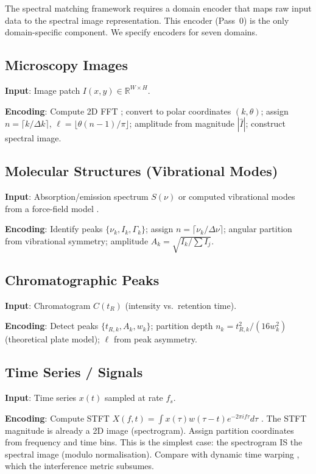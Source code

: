 \documentclass[11pt,twocolumn,a4paper]{article}
\newcommand{\R}{\mathbb{R}}
\begin{document}
The spectral matching framework requires a domain encoder that maps raw
input data to the spectral image representation. This encoder (Pass~0)
is the only domain-specific component. We specify encoders for seven
domains.

\subsection{Microscopy Images}
\label{subsec:enc_micro}

\textbf{Input}: Image patch $I(x,y) \in \R^{W \times H}$.

\textbf{Encoding}: Compute 2D FFT \citep{cooley1965}; convert to polar
coordinates $(k, \theta)$; assign $n = \lceil k/\Delta k \rceil$,
$\ell = \lfloor \theta(n-1)/\pi \rfloor$; amplitude from magnitude
$|\hat{I}|$; construct spectral image.

\subsection{Molecular Structures (Vibrational Modes)}
\label{subsec:enc_mol}

\textbf{Input}: Absorption/emission spectrum $S(\nu)$ or computed
vibrational modes from a force-field model
\citep{lennardjones1924}.

\textbf{Encoding}: Identify peaks $\{\nu_k, I_k, \Gamma_k\}$; assign
$n = \lceil \nu_k / \Delta\nu \rceil$; angular partition from
vibrational symmetry; amplitude $A_k = \sqrt{I_k / \sum I_j}$.

\subsection{Chromatographic Peaks}
\label{subsec:enc_chrom}

\textbf{Input}: Chromatogram $C(t_R)$ (intensity vs.\ retention time).

\textbf{Encoding}: Detect peaks $\{t_{R,k}, A_k, w_k\}$; partition
depth $n_k = t_{R,k}^2 / (16 w_k^2)$ (theoretical plate model);
$\ell$ from peak asymmetry.

\subsection{Time Series / Signals}
\label{subsec:enc_ts}

\textbf{Input}: Time series $x(t)$ sampled at rate $f_s$.

\textbf{Encoding}: Compute STFT $X(f,t) = \int x(\tau)w(\tau-t)
e^{-2\pi i f\tau} d\tau$ \citep{oppenheim1999, harris1978}. The STFT
magnitude is already a 2D image (spectrogram). Assign partition
coordinates from frequency and time bins. This is the simplest case:
the spectrogram IS the spectral image (modulo normalisation). Compare
with dynamic time warping \citep{sakoe1978, berndt1994}, which the
interference metric subsumes.
\end{document}
